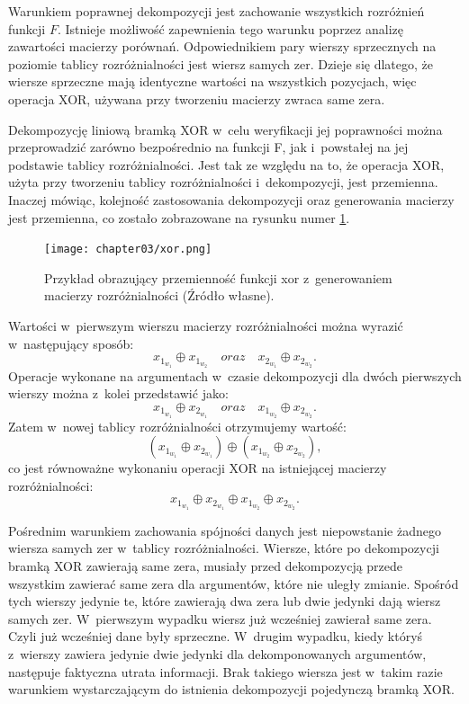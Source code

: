 Warunkiem poprawnej dekompozycji jest zachowanie wszystkich rozróżnień funkcji $F$.
Istnieje możliwość zapewnienia tego warunku poprzez analizę zawartości macierzy porównań.
Odpowiednikiem pary wierszy sprzecznych na poziomie tablicy rozróżnialności jest wiersz samych zer.
Dzieje się dlatego,
że wiersze sprzeczne mają identyczne wartości na wszystkich pozycjach,
więc operacja XOR,
używana przy tworzeniu macierzy zwraca same zera.

Dekompozycję liniową bramką XOR w~celu weryfikacji jej poprawności można przeprowadzić zarówno bezpośrednio na funkcji F,
jak i~powstałej na jej podstawie tablicy rozróżnialności.
Jest tak ze względu na to,
że operacja XOR,
użyta przy tworzeniu tablicy rozróżnialności i~dekompozycji,
jest przemienna.
Inaczej mówiąc,
kolejność zastosowania dekompozycji oraz generowania macierzy jest przemienna,
co zostało zobrazowane na rysunku numer \ref{fig:xor}.

\begin{figure}[H]
\centering
\texttt{[image: chapter03/xor.png]}
\caption{Przykład obrazujący przemienność funkcji xor z~generowaniem macierzy rozróżnialności (Źródło własne).}
\label{fig:xor}
\end{figure}

Wartości w~pierwszym wierszu macierzy rozróżnialności można wyrazić w~następujący sposób:
\begin{equation}
x_{1_{w_1}} \oplus x_{1_{w_2}} \quad oraz \quad x_{2_{w_1}} \oplus x_{2_{w_2}}.
\end{equation}
Operacje wykonane na argumentach w~czasie dekompozycji dla dwóch pierwszych wierszy można z~kolei przedstawić jako:
\begin{equation}
x_{1_{w_1}} \oplus x_{2_{w_1}} \quad oraz \quad x_{1_{w_2}} \oplus x_{2_{w_2}}.
\end{equation}
Zatem w~nowej tablicy rozróżnialności otrzymujemy wartość:
\begin{equation}
(x_{1_{w_1}} \oplus x_{2_{w_1}}) \oplus (x_{1_{w_2}} \oplus x_{2_{w_2}}),
\end{equation}
 co jest równoważne wykonaniu operacji XOR na istniejącej macierzy rozróżnialności:
\begin{equation}
x_{1_{w_1}} \oplus x_{2_{w_1}} \oplus x_{1_{w_2}} \oplus x_{2_{w_2}}.
\end{equation}

Pośrednim warunkiem zachowania spójności danych jest niepowstanie żadnego wiersza samych zer w~tablicy rozróżnialności.
Wiersze,
które po dekompozycji bramką XOR zawierają same zera,
musiały przed dekompozycją przede wszystkim zawierać same zera dla argumentów,
które nie uległy zmianie.
Spośród tych wierszy jedynie te,
które zawierają dwa zera lub dwie jedynki dają wiersz samych zer.
W~pierwszym wypadku wiersz już wcześniej zawierał same zera.
Czyli już wcześniej dane były sprzeczne.
W~drugim wypadku,
kiedy któryś z~wierszy zawiera jedynie dwie jedynki dla dekomponowanych argumentów,
następuje faktyczna utrata informacji.
Brak takiego wiersza jest w~takim razie warunkiem wystarczającym do istnienia dekompozycji pojedynczą bramką XOR.

